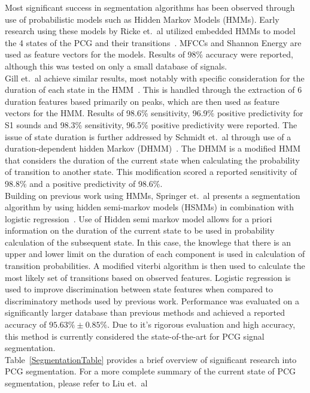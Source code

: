 \documentclass[titlepage, 12pt]{scrartcl} \usepackage{enumitem}
\begin{document}
Most significant success in segmentation algorithms has been observed through use
of probabilistic models such as Hidden Markov Models (HMMs). Early research
using these models by Ricke et.\ al utilized embedded HMMs to model the 4
states of the PCG and their transitions~\citeyearpar{Ricke2005}. MFCCs and
Shannon Energy are used as feature vectors for the models. Results of
98\% accuracy were reported, although this was tested on only a small database
of signals.\\
Gill et.\ al achieve similar results, most notably with specific consideration
for the duration of each state in the HMM~\citeyearpar{Gill2005}. This is
handled through the extraction of 6 duration features based primarily on peaks,
which are then used as feature vectors for the HMM. Results of 98.6\%
sensitivity, 96.9\% positive predictivity for S1 sounds and 98.3\% sensitivity,
96.5\% positive predictivity were reported.
The issue of state duration is further addressed by Schmidt et.\ al through use
of a duration-dependent hidden Markov (DHMM)~\citeyearpar{Schmidt2015}. The
DHMM is a modified HMM that considers the duration of the current state when
calculating the probability of transition to another state. This modification
scored a reported sensitivity of 98.8\% and a positive predictivity of
98.6\%.\\
Building on previous work using HMMs, Springer et.\ al presents a segmentation
algorithm by using hidden semi-markov models (HSMMs) in combination with
logistic regression~\citeyearpar{Springer2016}. Use of Hidden semi markov model
allows for a priori information on the duration of the current state to be used
in probability calculation of the subsequent state. In this case, the knowlege
that there is an upper and lower limit on the duration of each component is
used in calculation of transition probabilities.  A modified viterbi algorithm
is then used to calculate the most likely set of transitions based on observed
features. Logistic regression is used to improve discrimination between state
features when compared to discriminatory methods used by previous work.
Performance was evaluated on a significantly larger database than previous
methods and achieved a reported accuracy of $95.63\% \pm 0.85\%$. Due to it's
rigorous evaluation and high accuracy, this method is currently considered the
state-of-the-art for PCG signal segmentation.\\

Table~\ref{SegmentationTable} provides a brief overview of significant research
into PCG segmentation. For a more complete summary of the current state of PCG
segmentation, please refer to Liu et.\ al~\citeyearpar{Liu2016}
\end{document}
